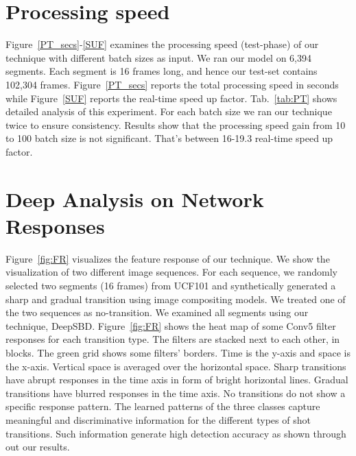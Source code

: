 \documentclass[journal]{IEEEtran}
\begin{document}
\section{Processing speed}

Figure~\ref{PT_secs}-\ref{SUF} examines the processing speed (test-phase) of our technique with different batch sizes as input. We ran our model on 6,394 segments. Each segment is 16 frames long, and hence our test-set contains 102,304 frames. Figure~\ref{PT_secs} reports the total processing speed in seconds while Figure~\ref{SUF} reports the real-time speed up factor. Tab.~\ref{tab:PT} shows detailed analysis of this experiment. For each batch size we ran our technique twice to ensure consistency. Results show that the processing speed gain from 10 to 100 batch size is not significant. That’s between 16-19.3 real-time speed up factor. 







\section{Deep Analysis on Network Responses}

Figure~\ref{fig:FR} visualizes the feature response of our technique. We show the visualization of two different image sequences. For each sequence, we randomly selected two segments (16 frames) from UCF101 and synthetically generated a sharp and gradual transition using image compositing models. We treated one of the two sequences as no-transition. We examined all segments using our technique, DeepSBD. 
Figure~\ref{fig:FR} shows the heat map of some Conv5 filter responses for each transition type. The filters are stacked next to each other, in blocks. The green grid shows some filters' borders. Time is the y-axis and space is the x-axis. Vertical space is averaged over the horizontal space. Sharp transitions have abrupt responses in the time axis in form of bright horizontal lines. Gradual transitions have blurred responses in the time axis. No transitions do not show a specific response pattern. The learned patterns of the three classes capture meaningful and discriminative information for the different types of shot transitions. Such information generate high detection accuracy as shown through out our results.
\end{document}
